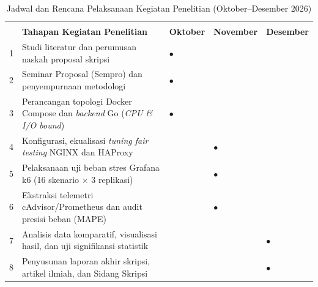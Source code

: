 \begin{table}[H]
    \centering
    \caption{Jadwal dan Rencana Pelaksanaan Kegiatan Penelitian (Oktober--Desember 2026)}
    \label{tab:jadwal_penelitian}
    \singlespacing
    \small
    \begin{tabularx}{\textwidth}{|c|X|*{3}{>{\centering\arraybackslash}p{1.7cm}|}}
        \hline
        \rowcolor[gray]{0.85}
        & & \multicolumn{3}{c|}{\textbf{Bulan Pelaksanaan (2026)}} \\
        \cline{3-5}
        \rowcolor[gray]{0.85}
        \multirow{-2}{*}{\textbf{No}} & \multirow{-2}{*}{\textbf{Tahapan Kegiatan Penelitian}} & \textbf{Oktober} & \textbf{November} & \textbf{Desember} \\
        \hline
        1 & Studi literatur dan perumusan naskah proposal skripsi & $\bullet$ & & \\
        \hline
        2 & Seminar Proposal (Sempro) dan penyempurnaan metodologi & $\bullet$ & & \\
        \hline
        3 & Perancangan topologi Docker Compose dan \textit{backend} Go (\textit{CPU \& I/O bound}) & $\bullet$ & & \\
        \hline
        4 & Konfigurasi, ekualisasi \textit{tuning fair testing} NGINX dan HAProxy & & $\bullet$ & \\
        \hline
        5 & Pelaksanaan uji beban stres Grafana k6 (16 skenario $\times$ 3 replikasi) & & $\bullet$ & \\
        \hline
        6 & Ekstraksi telemetri cAdvisor/Prometheus dan audit presisi beban (MAPE) & & $\bullet$ & \\
        \hline
        7 & Analisis data komparatif, visualisasi hasil, dan uji signifikansi statistik & & & $\bullet$ \\
        \hline
        8 & Penyusunan laporan akhir skripsi, artikel ilmiah, dan Sidang Skripsi & & & $\bullet$ \\
        \hline
    \end{tabularx}
\end{table}

